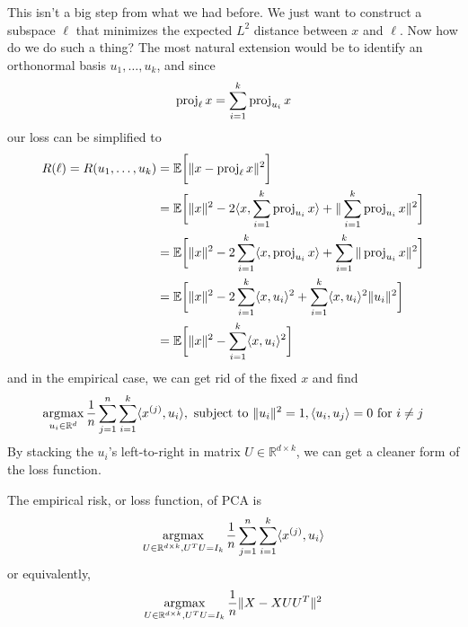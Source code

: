   This isn't a big step from what we had before. We just want to construct a subspace $\ell$ that minimizes the expected $L^2$ distance between $x$ and $\ell$. Now how do we do such a thing? The most natural extension would be to identify an orthonormal basis $u_1, \ldots, u_k$, and since 
  \begin{equation}
    \operatorname{proj}_\ell x = \sum_{i=1}^k \operatorname{proj}_{u_i} x
  \end{equation} 
  our loss can be simplified to 
  \begin{align}
    R(\ell) = R(u_1, \ldots, u_k) 
    & = \mathbb{E} \bigg[ \| x - \operatorname{proj}_\ell x \|^2 \bigg] \\ 
    & = \mathbb{E} \bigg[ \|x\|^2 - 2 \langle x, \sum_{i=1}^k \operatorname{proj}_{u_i} x \rangle + \| \sum_{i=1}^k \operatorname{proj}_{u_i} x \|^2 \bigg] \\ 
    & = \mathbb{E} \bigg[ \|x\|^2 - 2 \sum_{i=1}^k \langle x, \operatorname{proj}_{u_i} x \rangle + \sum_{i=1}^k \| \operatorname{proj}_{u_i} x \|^2 \bigg] \\
    & = \mathbb{E} \bigg[ \|x\|^2 - 2 \sum_{i=1}^k \langle x, u_i \rangle^2 + \sum_{i=1}^k \langle x, u_i \rangle^2 \|u_i\|^2 \bigg] \\ 
    & = \mathbb{E} \bigg[ \|x\|^2 - \sum_{i=1}^k \langle x, u_i \rangle^2 \bigg] 
  \end{align} 
  and in the empirical case, we can get rid of the fixed $x$ and find 
  \begin{equation}
    \operatorname*{\arg\!\max}_{u_i \in \mathbb{R}^d} \frac{1}{n} \sum_{j=1}^n \sum_{i=1}^k \langle x^{(j)}, u_i \rangle, \text{ subject to } \|u_i\|^2 = 1, \langle u_i, u_j \rangle = 0 \text{ for } i \neq j
  \end{equation} 
  By stacking the $u_i$'s left-to-right in matrix $U \in \mathbb{R}^{d \times k}$, we can get a cleaner form of the loss function. 

  \begin{theorem}
    The empirical risk, or loss function, of PCA is
    \begin{equation}
      \operatorname*{\arg\!\max}_{U \in \mathbb{R}^{d \times k}, U^T U = I_k} \frac{1}{n} \sum_{j=1}^n \sum_{i=1}^k \langle x^{(j)}, u_i \rangle
    \end{equation} 
    or equivalently, 
    \begin{equation}
      \operatorname*{\arg\!\max}_{U \in \mathbb{R}^{d \times k}, U^T U = I_k} 
      \frac{1}{n} \| X - X U U^T\|^2
    \end{equation}
  \end{theorem} 

